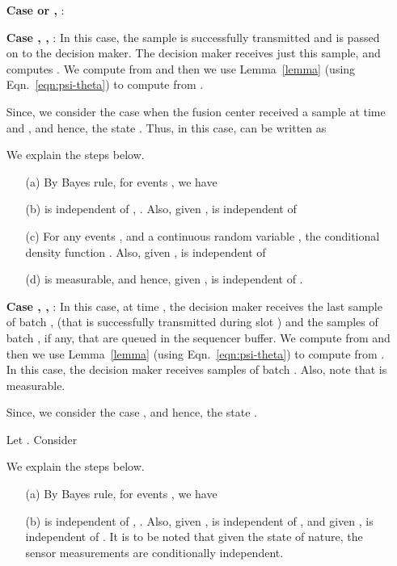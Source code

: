 \documentclass[acmtosn]{acmtrans2m}
\begin{document}
\begin{itemize}
\item[] {\bf Case  or , }:



\item[] {\bf Case , ,
}:
In this case, the sample  is successfully transmitted and
is passed on to the decision maker. The decision maker receives just
this sample, and computes . We compute  from  
and then we use Lemma~\ref{lemma} (using Eqn.~\ref{eqn:psi-theta}) to compute 
 from .

Since, we consider the case when the fusion center received a sample at time  and
,  and hence, the state .
Thus, in this case,  can be written as


{\footnotesize

}
We explain the steps  below.
\begin{itemize}
\item[(a)] By Bayes rule, for events , we have 
  
\item[(b)]  is independent of ,
. Also, given , 
 is independent of \ \ \ 

\item[(c)] For any events , and a continuous random variable ,
the conditional density
           function . Also,  given , 
 is independent of 


\item[(d)]   is 
measurable, and hence, given  , 
 is independent of .
\end{itemize}

\item[] {\bf Case , ,
}:
In this case, at time , the decision maker receives the last sample
of batch ,  (that is successfully transmitted during
slot ) and the samples of batch , if any, that are queued in
the sequencer buffer. We compute  from  and then we
use Lemma~\ref{lemma} (using Eqn.~\ref{eqn:psi-theta}) to compute
 from . In this case, the decision maker 
receives  samples of batch
. Also, note that  is  measurable.


Since, we consider the case ,  and hence, the state .

Let . Consider
{\footnotesize

}
We explain the steps  below.
\begin{itemize}
\item[(a)] By Bayes rule, for events , we have 
  
\item[(b)]  is independent of , 
. Also, given , 
 is independent of  , and 
given , 
 is independent of  . It is to be noted that 
given the state of nature, the sensor measurements 
are conditionally independent.


\end{itemize}
\end{itemize}
\end{document}
